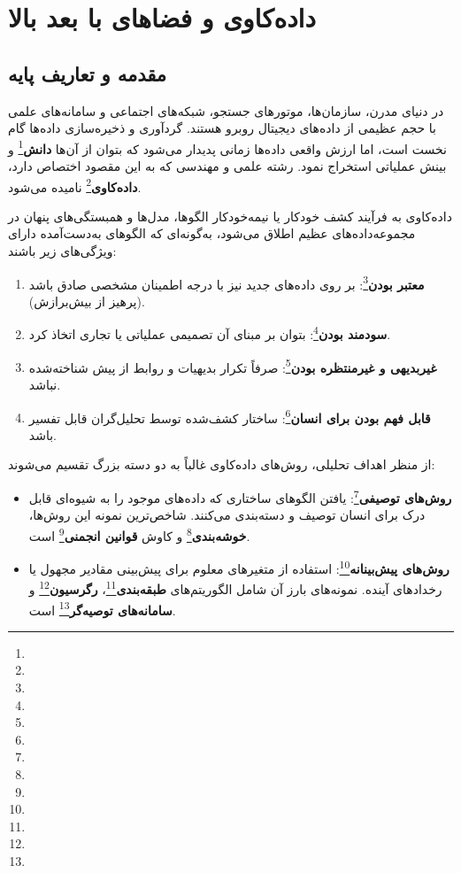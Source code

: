 \chapter{داده‌کاوی و فضاهای با بعد بالا}
\label{ch:data-mining}

\section{مقدمه و تعاریف پایه}
در دنیای مدرن، سازمان‌ها، موتورهای جستجو، شبکه‌های اجتماعی و سامانه‌های علمی با حجم عظیمی از داده‌های دیجیتال روبرو هستند. گردآوری و ذخیره‌سازی داده‌ها گام نخست است، اما ارزش واقعی داده‌ها زمانی پدیدار می‌شود که بتوان از آن‌ها \textbf{دانش}\footnote{} و بینش عملیاتی استخراج نمود. رشته علمی و مهندسی که به این مقصود اختصاص دارد، \textbf{داده‌کاوی}\footnote{} نامیده می‌شود.

\begin{definition}
داده‌کاوی به فرآیند کشف خودکار یا نیمه‌خودکار الگوها، مدل‌ها و همبستگی‌های پنهان در مجموعه‌داده‌های عظیم اطلاق می‌شود، به‌گونه‌ای که الگوهای به‌دست‌آمده دارای ویژگی‌های زیر باشند:
\begin{enumerate}
    \item \textbf{معتبر بودن}\footnote{}: بر روی داده‌های جدید نیز با درجه اطمینان مشخصی صادق باشد (پرهیز از بیش‌برازش).
    \item \textbf{سودمند بودن}\footnote{}: بتوان بر مبنای آن تصمیمی عملیاتی یا تجاری اتخاذ کرد.
    \item \textbf{غیربدیهی و غیرمنتظره بودن}\footnote{}: صرفاً تکرار بدیهیات و روابط از پیش شناخته‌شده نباشد.
    \item \textbf{قابل فهم بودن برای انسان}\footnote{}: ساختار کشف‌شده توسط تحلیل‌گران قابل تفسیر باشد.
\end{enumerate}
\end{definition}

از منظر اهداف تحلیلی، روش‌های داده‌کاوی غالباً به دو دسته بزرگ تقسیم می‌شوند:
\begin{itemize}
    \item \textbf{روش‌های توصیفی}\footnote{}: یافتن الگوهای ساختاری که داده‌های موجود را به شیوه‌ای قابل درک برای انسان توصیف و دسته‌بندی می‌کنند. شاخص‌ترین نمونه این روش‌ها، \textbf{خوشه‌بندی}\footnote{} و کاوش \textbf{قوانین انجمنی}\footnote{} است.
    \item \textbf{روش‌های پیش‌بینانه}\footnote{}: استفاده از متغیرهای معلوم برای پیش‌بینی مقادیر مجهول یا رخدادهای آینده. نمونه‌های بارز آن شامل الگوریتم‌های \textbf{طبقه‌بندی}\footnote{}، \textbf{رگرسیون}\footnote{} و \textbf{سامانه‌های توصیه‌گر}\footnote{} است.
\end{itemize}

